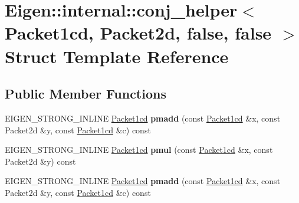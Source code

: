 \hypertarget{struct_eigen_1_1internal_1_1conj__helper_3_01_packet1cd_00_01_packet2d_00_01false_00_01false_01_4}{}\section{Eigen\+:\+:internal\+:\+:conj\+\_\+helper$<$ Packet1cd, Packet2d, false, false $>$ Struct Template Reference}
\label{struct_eigen_1_1internal_1_1conj__helper_3_01_packet1cd_00_01_packet2d_00_01false_00_01false_01_4}
\subsection*{Public Member Functions}
\begin{DoxyCompactItemize}
\item 
\mbox{\label{struct_eigen_1_1internal_1_1conj__helper_3_01_packet1cd_00_01_packet2d_00_01false_00_01false_01_4_a4dcc72037fc97411c0c2a28bebf7812d}} 
E\+I\+G\+E\+N\+\_\+\+S\+T\+R\+O\+N\+G\+\_\+\+I\+N\+L\+I\+NE \hyperlink{struct_eigen_1_1internal_1_1_packet1cd}{Packet1cd} {\bfseries pmadd} (const \hyperlink{struct_eigen_1_1internal_1_1_packet1cd}{Packet1cd} \&x, const Packet2d \&y, const \hyperlink{struct_eigen_1_1internal_1_1_packet1cd}{Packet1cd} \&c) const
\item 
\mbox{\label{struct_eigen_1_1internal_1_1conj__helper_3_01_packet1cd_00_01_packet2d_00_01false_00_01false_01_4_a3180e39d0a8f233420ef8fd3e5d26746}} 
E\+I\+G\+E\+N\+\_\+\+S\+T\+R\+O\+N\+G\+\_\+\+I\+N\+L\+I\+NE \hyperlink{struct_eigen_1_1internal_1_1_packet1cd}{Packet1cd} {\bfseries pmul} (const \hyperlink{struct_eigen_1_1internal_1_1_packet1cd}{Packet1cd} \&x, const Packet2d \&y) const
\item 
\mbox{\label{struct_eigen_1_1internal_1_1conj__helper_3_01_packet1cd_00_01_packet2d_00_01false_00_01false_01_4_a4dcc72037fc97411c0c2a28bebf7812d}} 
E\+I\+G\+E\+N\+\_\+\+S\+T\+R\+O\+N\+G\+\_\+\+I\+N\+L\+I\+NE \hyperlink{struct_eigen_1_1internal_1_1_packet1cd}{Packet1cd} {\bfseries pmadd} (const \hyperlink{struct_eigen_1_1internal_1_1_packet1cd}{Packet1cd} \&x, const Packet2d \&y, const \hyperlink{struct_eigen_1_1internal_1_1_packet1cd}{Packet1cd} \&c) const

\end{DoxyCompactItemize}
